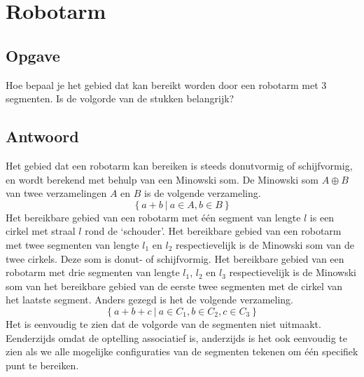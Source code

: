 \documentclass[examenvragen.tex]{subfiles}
\begin{document}
\section{Robotarm}
\subsection{Opgave}
Hoe bepaal je het gebied dat kan bereikt worden door een robotarm met 3 segmenten. Is de volgorde van de stukken belangrijk?

\subsection{Antwoord}
Het gebied dat een robotarm kan bereiken is steeds donutvormig of schijfvormig, en wordt berekend met behulp van een Minowski som.
De Minowski som $A\oplus B$ van twee verzamelingen  $A$ en $B$ is de volgende verzameling.
\[
\left\{
a + b\ |\ a \in A, b \in B
\right\}
\]
Het bereikbare gebied van een robotarm met \'e\'en segment van lengte $l$ is een cirkel met straal $l$ rond de `schouder'. Het bereikbare gebied van een robotarm met twee segmenten van lengte $l_1$ en $l_2$ respectievelijk is de Minowski som van de twee cirkels. Deze som is donut- of schijfvormig.
Het bereikbare gebied van een robotarm met drie segmenten van lengte $l_1$, $l_2$ en $l_3$ respectievelijk is de Minowski som van het bereikbare gebied van de eerste twee segmenten met de cirkel van het laatste segment. Anders gezegd is het de volgende verzameling.
\[
\left\{
a + b + c\ |\ a \in C_1, b \in C_2, c\in C_3
\right\}
\]
Het is eenvoudig te zien dat de volgorde van de segmenten niet uitmaakt. Eenderzijds omdat de optelling associatief is, anderzijds is het ook eenvoudig te zien als we alle mogelijke configuraties van de segmenten tekenen om \'e\'en specifiek punt te bereiken.
\end{document}
